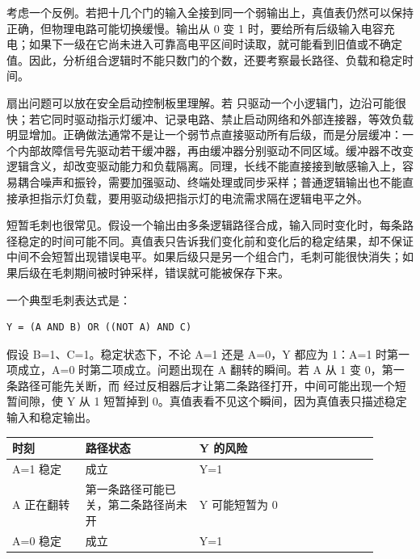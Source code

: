 考虑一个反例。若把十几个门的输入全接到同一个弱输出上，真值表仍然可以保持正确，但物理电路可能切换缓慢。输出从 0 变 1 时，要给所有后级输入电容充电；如果下一级在它尚未进入可靠高电平区间时读取，就可能看到旧值或不确定值。因此，分析组合逻辑时不能只数门的个数，还要考察最长路径、负载和稳定时间。

扇出问题可以放在安全启动控制板里理解。若  只驱动一个小逻辑门，边沿可能很快；若它同时驱动指示灯缓冲、记录电路、禁止启动网络和外部连接器，等效负载明显增加。正确做法通常不是让一个弱节点直接驱动所有后级，而是分层缓冲：一个内部故障信号先驱动若干缓冲器，再由缓冲器分别驱动不同区域。缓冲器不改变逻辑含义，却改变驱动能力和负载隔离。同理，长线不能直接接到敏感输入上，容易耦合噪声和振铃，需要加强驱动、终端处理或同步采样；普通逻辑输出也不能直接承担指示灯负载，要用驱动级把指示灯的电流需求隔在逻辑电平之外。

短暂毛刺也很常见。假设一个输出由多条逻辑路径合成，输入同时变化时，每条路径稳定的时间可能不同。真值表只告诉我们变化前和变化后的稳定结果，却不保证中间不会短暂出现错误电平。如果后级只是另一个组合门，毛刺可能很快消失；如果后级在毛刺期间被时钟采样，错误就可能被保存下来。

一个典型毛刺表达式是：

\begin{lstlisting}
Y = (A AND B) OR ((NOT A) AND C)
\end{lstlisting}

假设 B=1、C=1。稳定状态下，不论 A=1 还是 A=0，Y 都应为 1：A=1 时第一项成立，A=0 时第二项成立。问题出现在 A 翻转的瞬间。若 A 从 1 变 0，第一条路径可能先关断，而  经过反相器后才让第二条路径打开，中间可能出现一个短暂间隙，使 Y 从 1 短暂掉到 0。真值表看不见这个瞬间，因为真值表只描述稳定输入和稳定输出。

\begin{longtable}{L{0.18\linewidth}L{0.28\linewidth}L{0.44\linewidth}}
\toprule
时刻 & 路径状态 & Y 的风险 \\
\midrule
A=1 稳定 &  成立 & Y=1 \\\tablerowrule
A 正在翻转 & 第一条路径可能已关，第二条路径尚未开 & Y 可能短暂为 0 \\\tablerowrule
A=0 稳定 &  成立 & Y=1 \\
\bottomrule
\end{longtable}


